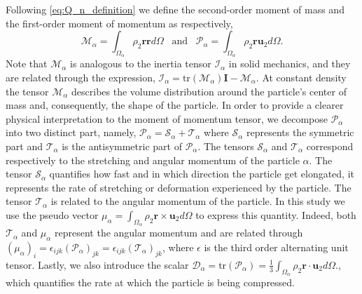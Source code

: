 Following \ref{eq:Q_n_definition} we define the second-order moment of mass and the first-order moment of momentum as respectively,
\begin{equation}
    \mathcal{M}_\alpha 
    = \int_{\Omega_\alpha} \rho_2 \textbf{r} \textbf{r} d\Omega
    \;\;\;\text{and}\;\;\;
    \mathcal{P}_\alpha 
    = \int_{\Omega_\alpha} \rho_2 \textbf{r} \textbf{u}_2 d\Omega.
    \label{eq:first_moment_of_momentum_def}
\end{equation}
Note that $\mathcal{M}_\alpha$ is analogous to the inertia tensor $\mathcal{I}_\alpha$ in solid mechanics, and they are related through the expression, $\mathcal{I}_\alpha = \text{tr}(\mathcal{M}_\alpha)\textbf{I} - \mathcal{M}_\alpha$.
At constant density the tensor $\mathcal{M}_\alpha$ describes the volume distribution around the particle's center of mass and, consequently, the shape of the particle.
In order to provide a clearer physical interpretation to the moment of momentum tensor, we decompose $\mathcal{P}_\alpha$ into two distinct part, namely,
$\mathcal{P}_\alpha = \mathcal{S}_\alpha+\mathcal{T}_\alpha$ where $\mathcal{S}_\alpha$ represents the symmetric part and $\mathcal{T}_\alpha$ is the antisymmetric part of $\mathcal{P}_\alpha$.
The tensors $\mathcal{S}_\alpha$ and $\mathcal{T}_\alpha$ correspond respectively to the stretching and angular momentum of the particle $\alpha$. 
The tensor $\mathcal{S}_\alpha$ quantifies how fast and in which direction the particle get elongated, it represents the rate of stretching or deformation experienced by the particle.
The tensor $\mathcal{T}_\alpha$ is related to the angular momentum of the particle. 
In this study we use the pseudo vector $\mu_\alpha = \int_{\Omega_\alpha} \rho_2 \textbf{r} \times \textbf{u}_2 d\Omega$ to express this quantity. 
Indeed, both  $\mathcal{T}_\alpha$ and $\mu_\alpha$ represent the angular momentum and are related through $(\mu_\alpha)_i = \epsilon_{ijk} (\mathcal{P}_\alpha)_{jk}= \epsilon_{ijk} (\mathcal{T}_\alpha)_{jk}$, where $\epsilon$ is the third order alternating unit tensor. 
Lastly, we also introduce the scalar $\mathcal{D}_\alpha = \text{tr}(\mathcal{P}_\alpha) = \frac{1}{3}\int_{\Omega_\alpha} \rho_2 \textbf{r} \cdot \textbf{u}_2 d\Omega.$, which quantifies the rate at which the particle is being compressed.



